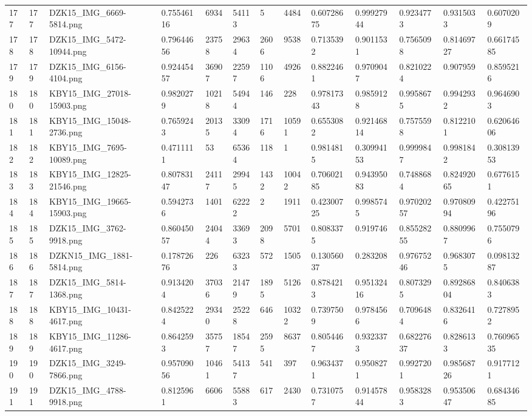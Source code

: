\documentclass[11pt, a4paper, twoside]{report}
\begin{document}
\begin{longtable}[c]{@{}lllllllllllll@{}}
177 & 177 & DZK15\_IMG\_6669-5814.png & 0.75546116 & 6934 & 54113 & 5 & 4484 & 0.60728675 & 0.99927944 & 0.9234773 & 0.9315033 & 0.6070209 \\
178 & 178 & DZK15\_IMG\_5472-10944.png & 0.79644656 & 23758 & 29634 & 2606 & 9538 & 0.7135392 & 0.9011531 & 0.7565098 & 0.81469727 & 0.66174585 \\
179 & 179 & DZK15\_IMG\_6156-4104.png & 0.92445457 & 36907 & 22597 & 1106 & 4926 & 0.8822461 & 0.9709047 & 0.8210224 & 0.907959 & 0.8595216 \\
180 & 180 & KBY15\_IMG\_27018-15903.png & 0.9820279 & 10218 & 54944 & 146 & 228 & 0.97817343 & 0.9859128 & 0.9958675 & 0.9942932 & 0.9646903 \\
181 & 181 & KBY15\_IMG\_15048-2736.png & 0.7659243 & 20135 & 33094 & 1716 & 10591 & 0.6553082 & 0.92146814 & 0.7575598 & 0.8122101 & 0.62064606 \\
182 & 182 & KBY15\_IMG\_7695-10089.png & 0.4711111 & 53 & 65364 & 118 & 1 & 0.9814815 & 0.30994153 & 0.9999847 & 0.9981842 & 0.30813953 \\
183 & 183 & KBY15\_IMG\_12825-21546.png & 0.80783147 & 24117 & 29945 & 1432 & 10042 & 0.70602185 & 0.94395083 & 0.7488684 & 0.82492065 & 0.6776151 \\
184 & 184 & KBY15\_IMG\_19665-15903.png & 0.5942736 & 1401 & 62222 & 2 & 1911 & 0.42300725 & 0.9985745 & 0.97020257 & 0.97080994 & 0.42275196 \\
185 & 185 & DZK15\_IMG\_3762-9918.png & 0.86045057 & 24044 & 33693 & 2098 & 5701 & 0.8083375 & 0.919746 & 0.85528255 & 0.8809967 & 0.7550796 \\
186 & 186 & DZKN15\_IMG\_1881-5814.png & 0.17872676 & 226 & 63233 & 572 & 1505 & 0.13056037 & 0.283208 & 0.97675246 & 0.9683075 & 0.09813287 \\
187 & 187 & DZK15\_IMG\_5814-1368.png & 0.9134204 & 37036 & 21479 & 1895 & 5126 & 0.8784213 & 0.95132416 & 0.8073295 & 0.89286804 & 0.8406383 \\
188 & 188 & KBY15\_IMG\_10431-4617.png & 0.8425224 & 29340 & 25228 & 646 & 10322 & 0.7397509 & 0.9784566 & 0.7096484 & 0.8326416 & 0.7278952 \\
189 & 189 & KBY15\_IMG\_11286-4617.png & 0.8642593 & 35757 & 18547 & 2595 & 8637 & 0.8054467 & 0.9323373 & 0.68227637 & 0.8286133 & 0.76096535 \\
190 & 190 & DZK15\_IMG\_3249-7866.png & 0.95709056 & 10461 & 54137 & 541 & 397 & 0.9634371 & 0.9508271 & 0.9927201 & 0.98568726 & 0.9177121 \\
191 & 191 & DZK15\_IMG\_4788-9918.png & 0.8125961 & 6606 & 55883 & 617 & 2430 & 0.7310757 & 0.91457844 & 0.9583283 & 0.95350647 & 0.68434685 \\

\end{longtable}
\end{document}
